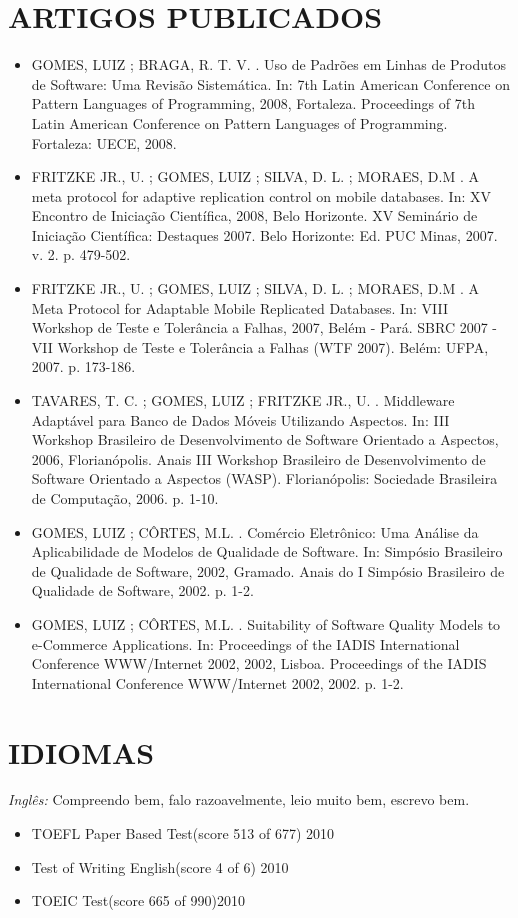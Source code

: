 \documentclass[margin, 10pt]{res}
\begin{document}
\begin{resume}
  \section{ARTIGOS PUBLICADOS}
  \begin{itemize}
    \item GOMES, LUIZ ; BRAGA, R. T. V. . Uso de Padrões em Linhas de Produtos de Software: Uma Revisão Sistemática. In: 7th Latin American Conference on 
      Pattern Languages of Programming, 2008, Fortaleza. Proceedings of 7th Latin American Conference on Pattern Languages of Programming. Fortaleza: UECE, 2008. 
    \item FRITZKE JR., U. ; GOMES, LUIZ ; SILVA, D. L. ; MORAES, D.M . A meta protocol for adaptive replication control on mobile databases. In: XV Encontro de 
      Iniciação Científica, 2008, Belo Horizonte. XV Seminário de Iniciação Científica: Destaques 2007. Belo Horizonte: Ed. PUC Minas, 2007. v. 2. p. 479-502. 
    \item FRITZKE JR., U. ; GOMES, LUIZ ; SILVA, D. L. ; MORAES, D.M . A Meta Protocol for Adaptable Mobile Replicated Databases. In: VIII Workshop de Teste e Tolerância a Falhas, 
      2007, Belém - Pará. SBRC 2007 - VII Workshop de Teste e Tolerância a Falhas (WTF 2007). Belém: UFPA, 2007. p. 173-186. 
    \item TAVARES, T. C. ; GOMES, LUIZ ; FRITZKE JR., U. . Middleware Adaptável para Banco de Dados Móveis Utilizando Aspectos. In: III Workshop Brasileiro de 
      Desenvolvimento de Software Orientado a Aspectos, 2006, Florianópolis. Anais III Workshop Brasileiro de Desenvolvimento de Software Orientado a Aspectos 
      (WASP). Florianópolis: Sociedade Brasileira de Computação, 2006. p. 1-10. 
     \item GOMES, LUIZ ; CÔRTES, M.L. . Comércio Eletrônico: Uma Análise da Aplicabilidade de Modelos de Qualidade de Software. In: Simpósio Brasileiro de Qualidade 
      de Software, 2002, Gramado. Anais do I Simpósio Brasileiro de Qualidade de Software, 2002. p. 1-2. 
    \item GOMES, LUIZ ; CÔRTES, M.L. . Suitability of Software Quality Models to e-Commerce Applications. In: Proceedings of the IADIS International Conference 
      WWW/Internet 2002, 2002, Lisboa. Proceedings of the IADIS International Conference WWW/Internet 2002, 2002. p. 1-2.
  \end{itemize}
 
  \section{IDIOMAS} 
  {\sl Inglês:} Compreendo bem, falo razoavelmente, leio muito bem, escrevo bem. 
  \begin{itemize} \itemsep -2pt %
    \item TOEFL Paper Based Test(score 513 of 677) \hfill 2010
    \item Test of Writing English(score 4 of 6) \hfill 2010
    \item TOEIC Test(score 665 of 990)\hfill 2010
  \end{itemize}
 

\end{resume}
\end{document}
